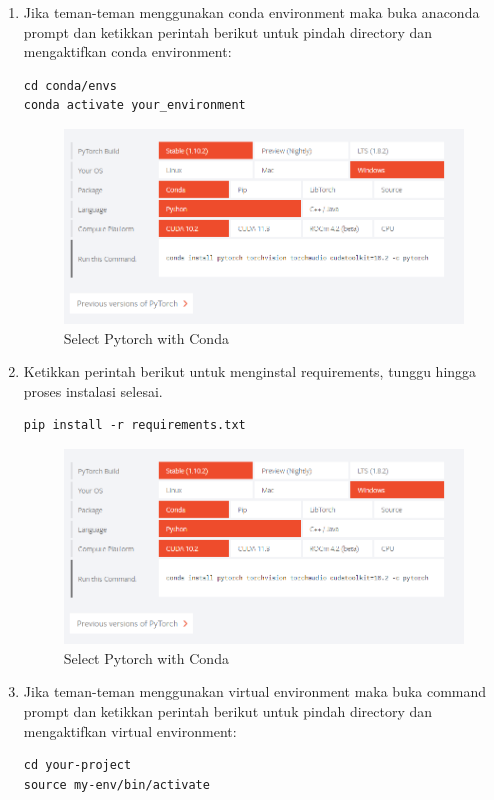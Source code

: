 \begin{enumerate}
\item Jika teman-teman menggunakan conda environment maka buka anaconda prompt dan ketikkan perintah berikut untuk pindah directory dan mengaktifkan conda environment:
\begin{verbatim}
cd conda/envs
conda activate your_environment
\end{verbatim}

\begin{figure}[H]
\centering
\includegraphics[scale=.35]{figures/pytorch1}
\caption{Select Pytorch with Conda}
\label{pytorch1}
\end{figure}

\item Ketikkan perintah berikut untuk menginstal requirements, tunggu hingga proses instalasi selesai.
\begin{verbatim}
pip install -r requirements.txt
\end{verbatim}

\begin{figure}[H]
\centering
\includegraphics[scale=.35]{figures/pytorch1}
\caption{Select Pytorch with Conda}
\label{pytorch1}
\end{figure}

\item Jika teman-teman menggunakan virtual environment maka buka command prompt dan ketikkan perintah berikut untuk pindah directory dan mengaktifkan virtual environment:
\begin{verbatim}
cd your-project
source my-env/bin/activate
\end{verbatim}


\end{enumerate}
